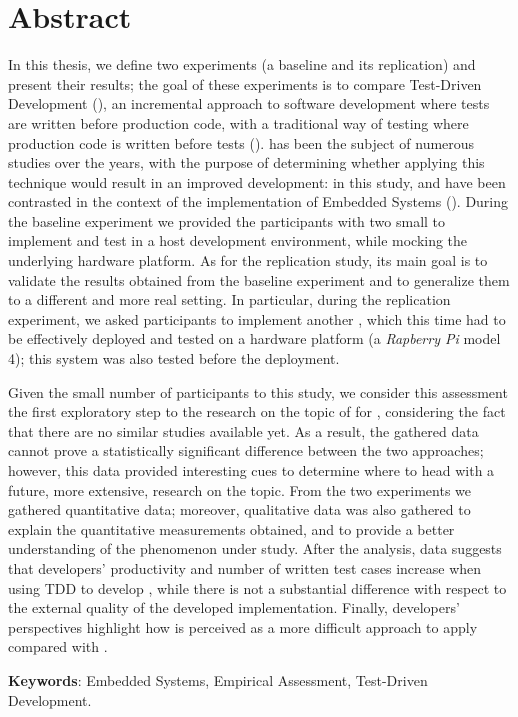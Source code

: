 \chapter*{Abstract}
In this thesis, we define two experiments (\ie a baseline and its replication) and present their results; the goal of these experiments is to compare Test-Driven Development (\tdd), an incremental approach to software development where tests are written before production code, with a traditional way of testing where production code is written before tests (\ie \notdd). 
\tdd has been the subject of numerous studies over the years, with the purpose of determining whether applying this technique would result in an improved development: in this study, \tdd and \notdd have been contrasted in the context of the implementation of Embedded Systems (\ess).
During the baseline experiment we provided the participants with two small \ess to implement and test in a host development environment, while mocking the underlying hardware platform.
As for the replication study, its main goal is to validate the results obtained from the baseline experiment and to generalize them to a different and more real setting. 
In particular, during the replication experiment, we asked participants to implement another \es, which this time had to be effectively deployed and tested on a hardware platform (\ie a \textit{Rapberry Pi} model 4); this system was also tested before the deployment.

Given the small number of participants to this study, we consider this assessment the first exploratory step to the research on the topic of \tdd for \ess, considering the fact that there are no similar studies available yet. As a result, the gathered data cannot prove a statistically significant difference between the two approaches; however, this data provided interesting cues to determine where to head with a future, more extensive, research on the topic.
From the two experiments we gathered quantitative data; moreover, qualitative data was also gathered to explain the quantitative measurements obtained, and to provide a better understanding of the phenomenon under study.
After the analysis, data suggests that developers' productivity and number of written test cases increase when using TDD to develop \ess, while there is not a substantial difference with respect to the external quality of the developed implementation. 
Finally, developers' perspectives highlight how \tdd is perceived as a more difficult approach to apply compared with \notdd.

\noindent \textbf{Keywords}: Embedded Systems, Empirical Assessment, Test-Driven Development.